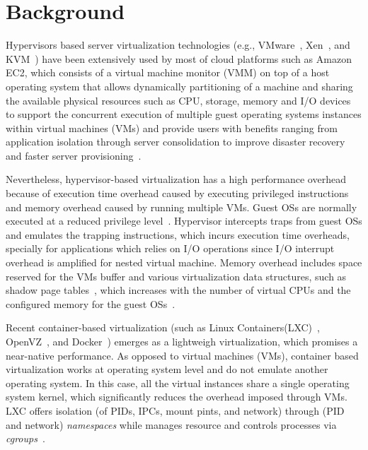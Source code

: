 
\section{Background}


Hypervisors based server virtualization technologies (e.g., VMware~\cite{xxx}, Xen~\cite{xxx}, and KVM~\cite{xxx}) have been extensively used by most of cloud platforms such as Amazon EC2, which consists of a virtual machine monitor (VMM) on top of a host operating system that allows dynamically partitioning of a machine and sharing the available physical resources such as CPU, storage, memory and I/O devices to support the concurrent execution of multiple guest operating systems instances within virtual machines (VMs) and provide users with benefits ranging from application isolation through server consolidation to improve disaster recovery and faster server provisioning~\cite{xxx}.

Nevertheless, hypervisor-based virtualization has a high performance overhead because of execution time overhead caused by executing privileged instructions and memory overhead caused by running multiple VMs. Guest OSs are normally executed at a reduced privilege level~\cite{}. Hypervisor intercepts traps from guest OSs and emulates the trapping instructions, which incurs execution time overheads, specially for applications which relies on I/O operations since I/O interrupt overhead is amplified for nested virtual machine. Memory overhead includes space reserved for the VMs buffer and various virtualization data structures, such as shadow page tables~\cite{}, which increases with the number of virtual CPUs and the configured memory for the guest OSs~\cite{}. 

Recent container-based virtualization (such as Linux Containers(LXC)~\cite{xxx}, OpenVZ~\cite{bibid}, and Docker~\cite{}) emerges as a lightweigh virtualization, which promises a near-native performance. As opposed to virtual machines (VMs), container based virtualization works at operating system level and do not emulate another operating system. In this case, all the virtual instances share a single operating system kernel, which significantly reduces the overhead imposed through VMs. LXC offers isolation (of PIDs, IPCs, mount pints, and network) through (PID and network) \textit{namespaces} while manages resource and controls processes via \textit{cgroups}~\cite{}. 

